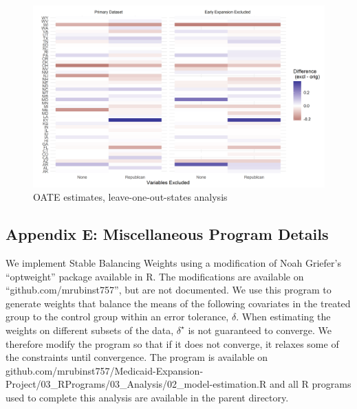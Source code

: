 \documentclass[12pt]{article}
\begin{document}
\begin{figure}[]
\begin{center}
    \includegraphics[scale=0.6]{01_Plots/oate-loo-state-cov-group-heatmap-states.png}
    \caption{OATE estimates, leave-one-out-states analysis}
    \label{fig:oateheatmap}
\end{center}
\end{figure}


\subsection{Appendix E: Miscellaneous Program Details}

We implement Stable Balancing Weights using a modification of Noah Griefer's ``optweight'' package available in R. The modifications are available on ``github.com/mrubinst757'', but are not documented. We use this program to generate weights that balance the means of the following covariates in the treated group to the control group within an error tolerance, $\delta$. When estimating the weights on different subsets of the data, $\delta^\star$ is not guaranteed to converge. We therefore modify the program so that if it does not converge, it relaxes some of the constraints until convergence. The program is available on github.com/mrubinst757/Medicaid-Expansion-Project/03\_RPrograms/03\_Analysis/02\_model-estimation.R and all R programs used to complete this analysis are available in the parent directory.
\end{document}
